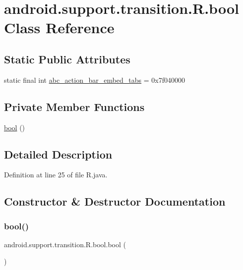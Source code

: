 \hypertarget{classandroid_1_1support_1_1transition_1_1_r_1_1bool}{}\section{android.\+support.\+transition.\+R.\+bool Class Reference}
\label{classandroid_1_1support_1_1transition_1_1_r_1_1bool}
\subsection*{Static Public Attributes}
\begin{DoxyCompactItemize}
\item 
static final int \mbox{\hyperlink{classandroid_1_1support_1_1transition_1_1_r_1_1bool_a84b992ac7b4ad5bd9328f8b255a3b363}{abc\+\_\+action\+\_\+bar\+\_\+embed\+\_\+tabs}} = 0x7f040000
\end{DoxyCompactItemize}
\subsection*{Private Member Functions}
\begin{DoxyCompactItemize}
\item 
\mbox{\hyperlink{classandroid_1_1support_1_1transition_1_1_r_1_1bool_a9665bfbf9a8674727761eae3f8ba6189}{bool}} ()
\end{DoxyCompactItemize}


\subsection{Detailed Description}


Definition at line 25 of file R.\+java.



\subsection{Constructor \& Destructor Documentation}
\mbox{\label{classandroid_1_1support_1_1transition_1_1_r_1_1bool_a9665bfbf9a8674727761eae3f8ba6189}} 
\subsubsection{\texorpdfstring{bool()}{bool()}}
{\footnotesize\ttfamily android.\+support.\+transition.\+R.\+bool.\+bool (\begin{DoxyParamCaption}{ }\end{DoxyParamCaption})\hspace{0.3cm}{\ttfamily [private]}}



